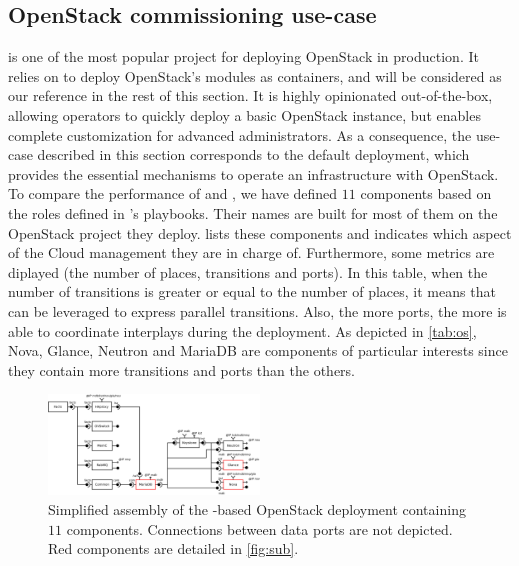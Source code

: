 \subsection{OpenStack commissioning use-case}

\begin{table}
  \begin{center}
    
    \caption{Number of places, transitions, ports and roles for each \mad component
        of the OpenStack assembly of Figure~\ref{fig:full}.}
    \label{tab:os}
  \end{center}
\end{table}

\kolla is one of the most popular project for deploying OpenStack in production.
It relies on \ansible to deploy OpenStack's modules as \docker containers, and
will be considered as our reference in the rest of this section. It is highly
opinionated out-of-the-box, allowing operators to quickly deploy a basic
OpenStack instance, but enables complete customization for advanced
administrators. As a consequence, the use-case described in this section
corresponds to the default \kolla deployment, which provides the essential
mechanisms to operate an infrastructure with OpenStack.
%
To compare the performance of \kolla and \mad, we have defined $11$ \mad
components based on the \ansible roles defined in \kolla's playbooks. Their
names are built for most of them on the OpenStack project they deploy.
 lists these components and indicates which aspect of the Cloud
management they are in charge of. Furthermore, some \mad metrics are diplayed
(\ie the number of places, transitions and ports).
%
In this table, when the number of transitions is greater or equal to the number
of places, it means that \mad can be leveraged to express parallel transitions.
Also, the more ports, the more \mad is able to coordinate interplays during the
deployment. As depicted in \cref{tab:os}, Nova, Glance, Neutron and MariaDB are
components of particular interests since they contain more transitions and ports
than the others.

\begin{figure}
  \begin{center}
    \includegraphics[width=0.5\textwidth]{./images/full.pdf}
    \caption{Simplified \mad assembly of the \kolla-based OpenStack deployment
    containing $11$ components. Connections between data ports are not depicted.
    Red components are detailed in \cref{fig:sub}.}
    \label{fig:full}
  \end{center}
\end{figure}

